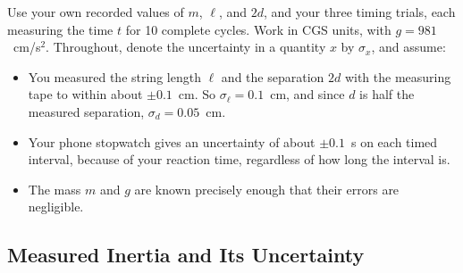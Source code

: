 \documentclass[11pt,letterpaper]{article}
\begin{document}
Use your own recorded values of $m$, $\ell$, and $2d$, and your three timing trials, each measuring the time $t$ for 10 complete cycles. Work in CGS units, with $g = 981$~cm/s$^2$. Throughout, denote the uncertainty in a quantity $x$ by $\sigma_x$, and assume:
\begin{itemize}
    \item You measured the string length $\ell$ and the separation $2d$ with the measuring tape to within about $\pm 0.1$~cm. So $\sigma_\ell = 0.1$~cm, and since $d$ is half the measured separation, $\sigma_d = 0.05$~cm.
    \item Your phone stopwatch gives an uncertainty of about $\pm 0.1$~s on each timed interval, because of your reaction time, regardless of how long the interval is.
    \item The mass $m$ and $g$ are known precisely enough that their errors are negligible.
\end{itemize}

\subsection*{Measured Inertia and Its Uncertainty}
\end{document}
